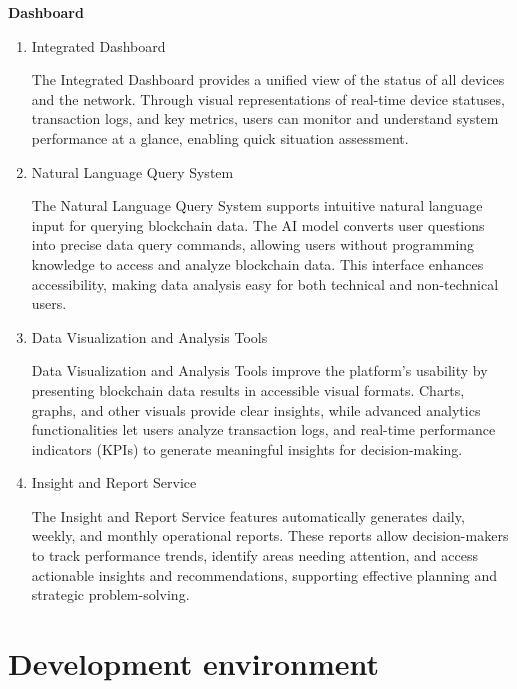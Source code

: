 \documentclass[conference]{IEEEtran}
\begin{document}
{\centering \textbf{Dashboard} \par}
\begin{enumerate}[itemsep=2ex, parsep=1ex]
	\item Integrated Dashboard
	      	      	      
	      The Integrated Dashboard provides a unified view of the status of all
	      devices and the network. Through visual representations of real-time device
	      statuses, transaction logs, and key metrics, users can monitor and
	      understand system performance at a glance, enabling quick situation assessment.
	      	      	      
	\item Natural Language Query System
	      	      	      
	      The Natural Language Query System supports intuitive natural language
	      input for querying blockchain data. The AI model converts user questions into
	      precise data query commands, allowing users without programming knowledge
	      to access and analyze blockchain data. This interface enhances accessibility,
	      making data analysis easy for both technical and non-technical users.
	      	      	      
	\item Data Visualization and Analysis Tools
	      	      	      
	      Data Visualization and Analysis Tools improve the platform’s usability by
	      presenting blockchain data results in accessible visual formats. Charts,
	      graphs, and other visuals provide clear insights, while advanced analytics
	      functionalities let users analyze transaction logs, and real-time performance
	      indicators (KPIs) to generate meaningful insights for decision-making.
	      	      	      
	\item Insight and Report Service
	      	      	      
	      The Insight and Report Service features automatically generates daily, weekly,
	      and monthly operational reports. These reports allow decision-makers to track
	      performance trends, identify areas needing attention, and access actionable
	      insights and recommendations, supporting effective planning and strategic
	      problem-solving.
\end{enumerate}

\section{Development environment}
\end{document}
